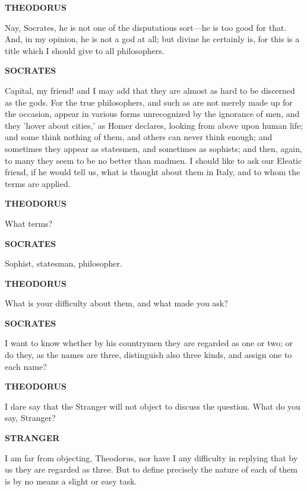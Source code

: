 \documentclass[11pt,letter]{article}
\begin{document}
\par \textbf{THEODORUS}
\par   Nay, Socrates, he is not one of the disputatious sort—he is too good for that. And, in my opinion, he is not a god at all; but divine he certainly is, for this is a title which I should give to all philosophers.

\par \textbf{SOCRATES}
\par   Capital, my friend! and I may add that they are almost as hard to be discerned as the gods. For the true philosophers, and such as are not merely made up for the occasion, appear in various forms unrecognized by the ignorance of men, and they 'hover about cities,' as Homer declares, looking from above upon human life; and some think nothing of them, and others can never think enough; and sometimes they appear as statesmen, and sometimes as sophists; and then, again, to many they seem to be no better than madmen. I should like to ask our Eleatic friend, if he would tell us, what is thought about them in Italy, and to whom the terms are applied.

\par \textbf{THEODORUS}
\par   What terms?

\par \textbf{SOCRATES}
\par   Sophist, statesman, philosopher.

\par \textbf{THEODORUS}
\par   What is your difficulty about them, and what made you ask?

\par \textbf{SOCRATES}
\par   I want to know whether by his countrymen they are regarded as one or two; or do they, as the names are three, distinguish also three kinds, and assign one to each name?

\par \textbf{THEODORUS}
\par   I dare say that the Stranger will not object to discuss the question. What do you say, Stranger?

\par \textbf{STRANGER}
\par   I am far from objecting, Theodorus, nor have I any difficulty in replying that by us they are regarded as three. But to define precisely the nature of each of them is by no means a slight or easy task.
\end{document}
